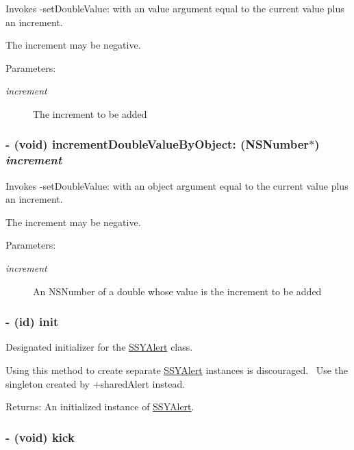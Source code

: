 Invokes -setDoubleValue: with an value argument equal to the current value plus an increment. 

The increment may be negative. \begin{Desc}
\item[Parameters:]
\begin{description}
\item[{\em increment}]The increment to be added \end{description}
\end{Desc}
\hypertarget{interface_s_s_y_alert_31ac913c7a345fe1decb48da5b0fdf03}{
\subsubsection[{incrementDoubleValueByObject:}]{\setlength{\rightskip}{0pt plus 5cm}- (void) incrementDoubleValueByObject: (NSNumber$\ast$) {\em increment}}}
\label{interface_s_s_y_alert_31ac913c7a345fe1decb48da5b0fdf03}


Invokes -setDoubleValue: with an object argument equal to the current value plus an increment. 

The increment may be negative. \begin{Desc}
\item[Parameters:]
\begin{description}
\item[{\em increment}]An NSNumber of a double whose value is the increment to be added \end{description}
\end{Desc}
\hypertarget{interface_s_s_y_alert_e007c72529e2e0dc031572c278a0c331}{
\subsubsection[{init}]{\setlength{\rightskip}{0pt plus 5cm}- (id) init }}
\label{interface_s_s_y_alert_e007c72529e2e0dc031572c278a0c331}


Designated initializer for the \hyperlink{interface_s_s_y_alert}{SSYAlert} class. 

Using this method to create separate \hyperlink{interface_s_s_y_alert}{SSYAlert} instances is discouraged.~ Use the singleton created by +sharedAlert instead. \begin{Desc}
\item[Returns:]An initialized instance of \hyperlink{interface_s_s_y_alert}{SSYAlert}. \end{Desc}
\hypertarget{interface_s_s_y_alert_e61cd5f059bc63c651854ad1f12e4bf0}{
\subsubsection[{kick}]{\setlength{\rightskip}{0pt plus 5cm}- (void) kick }}
\label{interface_s_s_y_alert_e61cd5f059bc63c651854ad1f12e4bf0}


